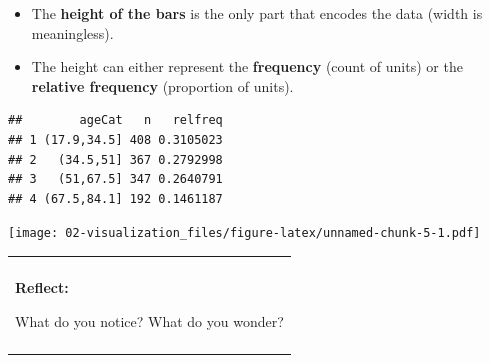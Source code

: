 \documentclass[
]{book}
\newenvironment{Shaded}{\begin{snugshade}}{\end{snugshade}}
\newcommand{\CommentTok}[1]{\textcolor[rgb]{0.56,0.35,0.01}{\textit{#1}}}
\newcommand{\DataTypeTok}[1]{\textcolor[rgb]{0.13,0.29,0.53}{#1}}
\newcommand{\KeywordTok}[1]{\textcolor[rgb]{0.13,0.29,0.53}{\textbf{#1}}}
\newcommand{\NormalTok}[1]{#1}
\newcommand{\OperatorTok}[1]{\textcolor[rgb]{0.81,0.36,0.00}{\textbf{#1}}}
\newcommand{\StringTok}[1]{\textcolor[rgb]{0.31,0.60,0.02}{#1}}
\providecommand{\tightlist}{%
  \setlength{\itemsep}{0pt}\setlength{\parskip}{0pt}}
\newenvironment{reflect}
{
    \begin{center}
    
    \begin{tabular}{|p{0.8\textwidth}|}
    \rowcolor{LightBlue}
    \hline\\
    \rowcolor{LightBlue}
    \textbf{Reflect:}
}
{
    \\\rowcolor{LightBlue}
    \\\hline
    \end{tabular} 
    \end{center}
}
\begin{document}
\begin{itemize}
\tightlist
\item
  The \textbf{height of the bars} is the only part that encodes the data (width is meaningless).
\item
  The height can either represent the \textbf{frequency} (count of units) or the \textbf{relative frequency} (proportion of units).
\end{itemize}

\begin{Shaded}
\end{Shaded}

\begin{verbatim}
##        ageCat   n   relfreq
## 1 (17.9,34.5] 408 0.3105023
## 2   (34.5,51] 367 0.2792998
## 3   (51,67.5] 347 0.2640791
## 4 (67.5,84.1] 192 0.1461187
\end{verbatim}

\begin{Shaded}
\end{Shaded}

\texttt{[image: 02-visualization\_files/figure-latex/unnamed-chunk-5-1.pdf]}

\begin{reflect}
What do you notice? What do you wonder?
\end{reflect}
\end{document}

